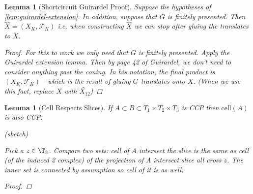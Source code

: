 \documentclass{article}
\theoremstyle{mystyle}
\newtheorem{lem}[thm]{Lemma}
\theoremstyle{remark}
\begin{document}
\begin{lem}
    [Shortcircuit Guirardel Proof]
    \label{lem:shortcircuit} Suppose the hypotheses of \ref{lem:guirardel-extension}. In addition, suppose that $G$ is finitely presented. Then $\widehat X = (X_K, \mathscr{F}_K)$ i.e. when constructing $\widehat X$ we can stop after gluing the translates to $X$.
    \begin{proof}
        
        For this to work we only need that $G$ is finitely presented. Apply the Guirardel extension lemma. Then by page 42 of Guirardel, we don't need to consider anything past the coning. In his notation, the final product is $(X_K, \mathscr{F}_K)$ - which is the result of gluing $G$ translates onto $X$. (When we use this fact, replace $X$ with $\widetilde{X_{12}}$)
    \end{proof}
\end{lem}
\begin{lem}
    [Cell Respects Slices]
    If $A\subset B\subset T_1\times T_2\times T_3$ is CCP then $\text{cell}(A)$ is also CCP.
    \label{lem:cellrespecslice} 
    
    (sketch)
        
        Pick a $z \in \T_3$. Compare two sets: cell of A intersect the slice is the same as cell (of the induced 2 complex) of the projection of A intersect slice all cross $z$. The inner set is connected by assumption so cell of it is as well.
    
    \begin{proof}
    
    \end{proof}
\end{lem}
\end{document}
